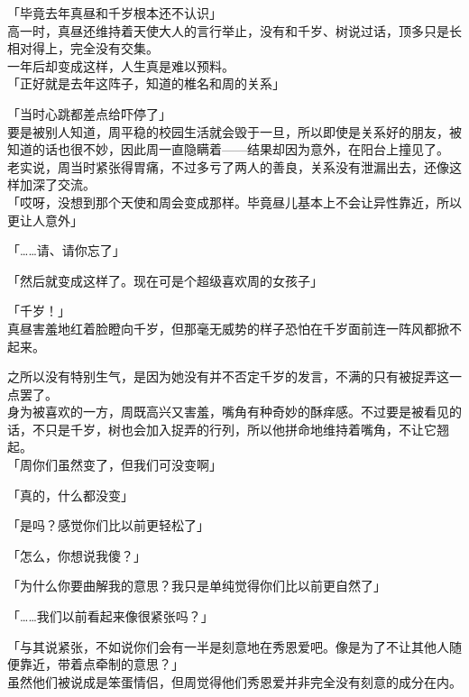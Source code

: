 「毕竟去年真昼和千岁根本还不认识」\\

高一时，真昼还维持着天使大人的言行举止，没有和千岁、树说过话，顶多只是长相对得上，完全没有交集。\\

一年后却变成这样，人生真是难以预料。\\

「正好就是去年这阵子，知道的椎名和周的关系」

「当时心跳都差点给吓停了」\\

要是被别人知道，周平稳的校园生活就会毁于一旦，所以即使是关系好的朋友，被知道的话也很不妙，因此周一直隐瞒着——结果却因为意外，在阳台上撞见了。\\

老实说，周当时紧张得胃痛，不过多亏了两人的善良，关系没有泄漏出去，还像这样加深了交流。\\

「哎呀，没想到那个天使和周会变成那样。毕竟昼儿基本上不会让异性靠近，所以更让人意外」

「……请、请你忘了」

「然后就变成这样了。现在可是个超级喜欢周的女孩子」

「千岁！」\\

真昼害羞地红着脸瞪向千岁，但那毫无威势的样子恐怕在千岁面前连一阵风都掀不起来。

之所以没有特别生气，是因为她没有并不否定千岁的发言，不满的只有被捉弄这一点罢了。\\

身为被喜欢的一方，周既高兴又害羞，嘴角有种奇妙的酥痒感。不过要是被看见的话，不只是千岁，树也会加入捉弄的行列，所以他拼命地维持着嘴角，不让它翘起。\\

「周你们虽然变了，但我们可没变啊」

「真的，什么都没变」

「是吗？感觉你们比以前更轻松了」

「怎么，你想说我傻？」

「为什么你要曲解我的意思？我只是单纯觉得你们比以前更自然了」

「……我们以前看起来像很紧张吗？」

「与其说紧张，不如说你们会有一半是刻意地在秀恩爱吧。像是为了不让其他人随便靠近，带着点牵制的意思？」\\

虽然他们被说成是笨蛋情侣，但周觉得他们秀恩爱并非完全没有刻意的成分在内。

